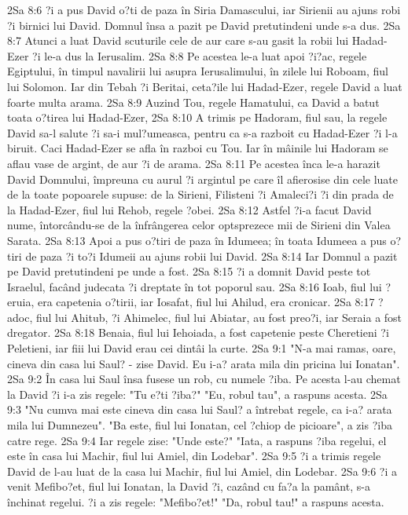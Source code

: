 2Sa 8:6  ?i a pus David o?ti de paza în Siria Damascului, iar Sirienii au ajuns robi ?i birnici lui David. Domnul însa a pazit pe David pretutindeni unde s-a dus.
2Sa 8:7  Atunci a luat David scuturile cele de aur care s-au gasit la robii lui Hadad-Ezer ?i le-a dus la Ierusalim.
2Sa 8:8  Pe acestea le-a luat apoi ?i?ac, regele Egiptului, în timpul navalirii lui asupra Ierusalimului, în zilele lui Roboam, fiul lui Solomon. Iar din Tebah ?i Beritai, ceta?ile lui Hadad-Ezer, regele David a luat foarte multa arama.
2Sa 8:9  Auzind Tou, regele Hamatului, ca David a batut toata o?tirea lui Hadad-Ezer,
2Sa 8:10  A trimis pe Hadoram, fiul sau, la regele David sa-l salute ?i sa-i mul?umeasca, pentru ca s-a razboit cu Hadad-Ezer ?i l-a biruit. Caci Hadad-Ezer se afla în razboi cu Tou. Iar în mâinile lui Hadoram se aflau vase de argint, de aur ?i de arama.
2Sa 8:11  Pe acestea înca le-a harazit David Domnului, împreuna cu aurul ?i argintul pe care îl afierosise din cele luate de la toate popoarele supuse: de la Sirieni, Filisteni ?i Amaleci?i ?i din prada de la Hadad-Ezer, fiul lui Rehob, regele ?obei.
2Sa 8:12  Astfel ?i-a facut David nume, întorcându-se de la înfrângerea celor optsprezece mii de Sirieni din Valea Sarata.
2Sa 8:13  Apoi a pus o?tiri de paza în Idumeea; în toata Idumeea a pus o?tiri de paza ?i to?i Idumeii au ajuns robii lui David.
2Sa 8:14  Iar Domnul a pazit pe David pretutindeni pe unde a fost.
2Sa 8:15  ?i a domnit David peste tot Israelul, facând judecata ?i dreptate în tot poporul sau.
2Sa 8:16  Ioab, fiul lui ?eruia, era capetenia o?tirii, iar Iosafat, fiul lui Ahilud, era cronicar.
2Sa 8:17  ?adoc, fiul lui Ahitub, ?i Ahimelec, fiul lui Abiatar, au fost preo?i, iar Seraia a fost dregator.
2Sa 8:18  Benaia, fiul lui Iehoiada, a fost capetenie peste Cheretieni ?i Peletieni, iar fiii lui David erau cei dintâi la curte.
2Sa 9:1  "N-a mai ramas, oare, cineva din casa lui Saul? - zise David. Eu i-a? arata mila din pricina lui Ionatan".
2Sa 9:2  În casa lui Saul însa fusese un rob, cu numele ?iba. Pe acesta l-au chemat la David ?i i-a zis regele: "Tu e?ti ?iba?" "Eu, robul tau", a raspuns acesta.
2Sa 9:3  "Nu cumva mai este cineva din casa lui Saul? a întrebat regele, ca i-a? arata mila lui Dumnezeu". "Ba este, fiul lui Ionatan, cel ?chiop de picioare", a zis ?iba catre rege.
2Sa 9:4  Iar regele zise: "Unde este?" "Iata, a raspuns ?iba regelui, el este în casa lui Machir, fiul lui Amiel, din Lodebar".
2Sa 9:5  ?i a trimis regele David de l-au luat de la casa lui Machir, fiul lui Amiel, din Lodebar.
2Sa 9:6  ?i a venit Mefibo?et, fiul lui Ionatan, la David ?i, cazând cu fa?a la pamânt, s-a închinat regelui. ?i a zis regele: "Mefibo?et!" "Da, robul tau!" a raspuns acesta.
